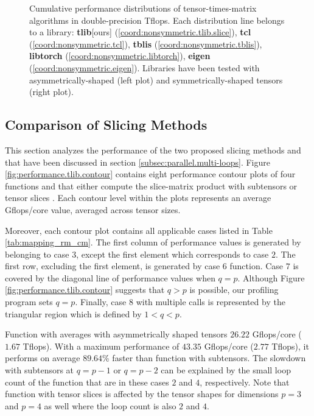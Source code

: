 \begin{figure*}[t]


\caption{ %
\footnotesize%
Cumulative performance distributions of tensor-times-matrix algorithms in double-precision Tflops.
Each distribution line belongs to a library:
\textbf{tlib}[ours] (\ref{coord:nonsymmetric.tlib.slice}), %
\textbf{tcl} (\ref{coord:nonsymmetric.tcl}), %
\textbf{tblis} (\ref{coord:nonsymmetric.tblis}), %
\textbf{libtorch} (\ref{coord:nonsymmetric.libtorch}), %
\textbf{eigen} (\ref{coord:nonsymmetric.eigen}).
Libraries have been tested with asymmetrically-shaped (left plot) and symmetrically-shaped tensors (right plot).
}
\label{fig:performance.comparison}
\end{figure*}


\subsection{Comparison of Slicing Methods}
This section analyzes the performance of the two proposed slicing methods  and  that have been discussed in section \ref{subsec:parallel.multi-loops}.
Figure \ref{fig:performance.tlib.contour} contains eight performance contour plots of four  functions \allowbreak{} and \allowbreak{} that either compute the slice-matrix product with subtensors  or tensor slices .
Each contour level within the plots represents an average Gflops/core value, averaged across tensor sizes.

Moreover, each contour plot contains all applicable  cases listed in Table \ref{tab:mapping_rm_cm}.
The first column of performance values is generated by  belonging to case $3$, except the first element which corresponds to case $2$.
The first row, excluding the first element, is generated by case $6$ function.
Case $7$ is covered by the diagonal line of performance values when $q = p$.  
Although Figure \ref{fig:performance.tlib.contour} suggests that $q>p$ is possible, our profiling program sets $q=p$.
Finally, case $8$ with multiple  calls is represented by the triangular region which is defined by $1<q<p$.


Function  with \allowbreak{}\allowbreak{} averages with asymmetrically shaped tensors $26.22$ Gflops/core ($1.67$ Tflops).
With a maximum performance of $43.35$ Gflops/core ($2.77$ Tflops), it performs on average $89.64$\% faster than function \allowbreak{} with subtensors.
The slowdown with subtensors at $q=p-1$ or $q=p-2$ can be explained by the small loop count of the function that are in these cases $2$ and $4$, respectively.
Note that function \allowbreak{} with tensor slices is affected by the tensor shapes for dimensions $p=3$ and $p=4$ as well where the loop count is also $2$ and $4$.

